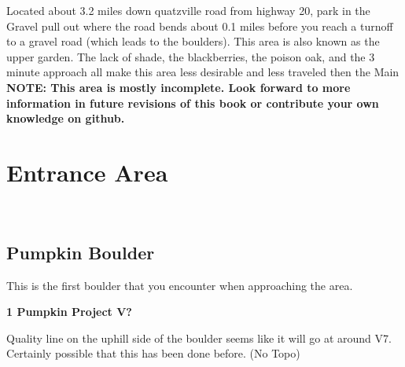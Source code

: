 \raggedcolumns
\begin{multicols}{2}
\begin{minipage}{\columnwidth}
Located about 3.2 miles down quatzville road from highway 20, park in the Gravel pull out where the road bends about 0.1 miles before you reach a turnoff to a gravel road (which leads to the boulders). This area is also known as the upper garden. The lack of shade, the blackberries, the poison oak, and the 3 minute approach all make this area less desirable and less traveled then the Main
\newline
\textbf{NOTE: This area is mostly incomplete. Look forward to more information in future revisions of this book or contribute your own knowledge on github.}
\end{minipage}

\newpage
		\section{Entrance Area}\label{sa:Entrance Area}
	\begin{minipage}{\columnwidth}
	\
	\end{minipage}
	
			\begin{minipage}{\columnwidth}
			\subsection*{Pumpkin Boulder}\label{bf:Pumpkin Boulder}
			This is the first boulder that you encounter when approaching the area.
			
			\end{minipage}
			
					\begin{minipage}{\linewidth}	
					\label{rt:Pumpkin Project}
\colorbox{black!20}{
\parbox{0.95\textwidth}{
\textbf{
1 Pumpkin Project V?  
}
}
}

					\begin{adjustwidth}{0.5cm}{}				
					Quality line on the uphill side of the boulder seems like it will go at around V7. Certainly possible that this has been done before.
						\newline (No Topo) 
					\end{adjustwidth}
					\end{minipage}
			\begin{minipage}{\columnwidth}

\end{minipage}
\end{multicols}
